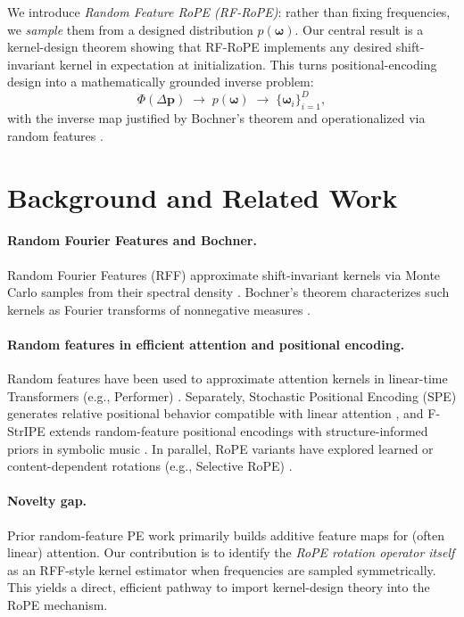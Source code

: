 \documentclass{article}
\theoremstyle{plain}
\theoremstyle{remark}
\begin{document}
We introduce \emph{Random Feature RoPE (RF-RoPE)}: rather than fixing frequencies, we \emph{sample} them from a designed distribution $p(\boldsymbol{\omega})$. Our central result is a kernel-design theorem showing that RF-RoPE implements any desired shift-invariant kernel in expectation at initialization. This turns positional-encoding design into a mathematically grounded inverse problem:
\[
\Phi(\Delta \mathbf{p}) \;\longrightarrow\; p(\boldsymbol{\omega}) \;\longrightarrow\; \{\boldsymbol{\omega}_i\}_{i=1}^{D},
\]
with the inverse map justified by Bochner's theorem \cite{bochner1955harmonic,rasmussen2006gpml} and operationalized via random features \cite{rahimi2007random}.

\section{Background and Related Work}
\paragraph{Random Fourier Features and Bochner.}
Random Fourier Features (RFF) approximate shift-invariant kernels via Monte Carlo samples from their spectral density \cite{rahimi2007random}. Bochner's theorem characterizes such kernels as Fourier transforms of nonnegative measures \cite{bochner1955harmonic,rasmussen2006gpml}.

\paragraph{Random features in efficient attention and positional encoding.}
Random features have been used to approximate attention kernels in linear-time Transformers (e.g., Performer) \cite{choromanski2021performer}. Separately, Stochastic Positional Encoding (SPE) generates relative positional behavior compatible with linear attention \cite{liutkus2021relative}, and F-StrIPE extends random-feature positional encodings with structure-informed priors in symbolic music \cite{agarwal2025fstripe}. In parallel, RoPE variants have explored learned or content-dependent rotations (e.g., Selective RoPE) \cite{movahedi2025selectiverope}.

\paragraph{Novelty gap.}
Prior random-feature PE work primarily builds additive feature maps for (often linear) attention. Our contribution is to identify the \emph{RoPE rotation operator itself} as an RFF-style kernel estimator when frequencies are sampled symmetrically. This yields a direct, efficient pathway to import kernel-design theory into the RoPE mechanism.
\end{document}
